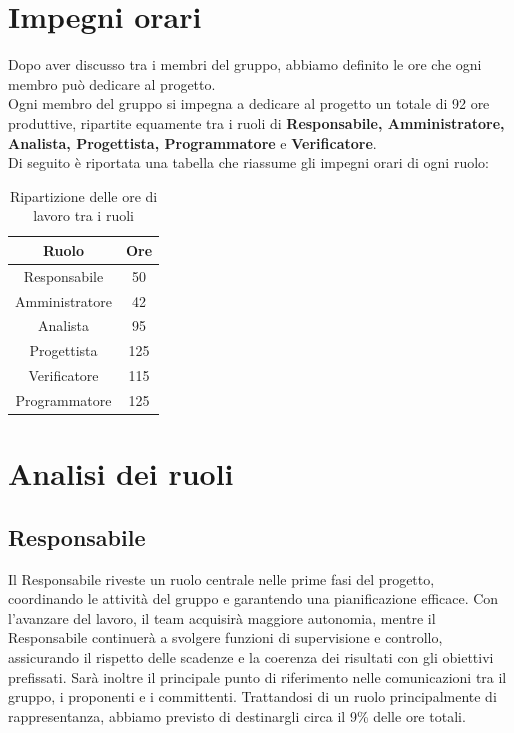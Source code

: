 \documentclass{article}
\begin{document}
	\section{Impegni orari}
	Dopo aver discusso tra i membri del gruppo, abbiamo definito le ore che ogni membro può dedicare al progetto.\\
	Ogni membro del gruppo si impegna a dedicare al progetto un totale di 92 ore produttive, ripartite equamente tra i ruoli di \textbf{Responsabile, Amministratore, Analista, Progettista, Programmatore} e \textbf{Verificatore}.\\
	Di seguito è riportata una tabella che riassume gli impegni orari di ogni ruolo:	
	
	\begin{table}[h!]
		\centering
		\begin{tabular}{|c|c|}
			\hline
			\rowcolor{gray!25}
			Ruolo & Ore \\ \hline
			Responsabile & 50 \\ \hline
			Amministratore & 42 \\ \hline
			Analista & 95 \\ \hline
			Progettista & 125 \\ \hline
			Verificatore & 115 \\ \hline
			Programmatore & 125 \\ \hline
		\end{tabular}
		\caption{Ripartizione delle ore di lavoro tra i ruoli}
	\end{table}
	
	\section{Analisi dei ruoli}
	\subsection{Responsabile}
	Il Responsabile riveste un ruolo centrale nelle prime fasi del progetto, coordinando le attività del gruppo e garantendo una pianificazione efficace.
	Con l’avanzare del lavoro, il team acquisirà maggiore autonomia, mentre il Responsabile continuerà a svolgere funzioni di supervisione e controllo, assicurando il rispetto delle scadenze e la coerenza dei risultati con gli obiettivi prefissati.
	Sarà inoltre il principale punto di riferimento nelle comunicazioni tra il gruppo, i proponenti e i committenti.
	Trattandosi di un ruolo principalmente di rappresentanza, abbiamo previsto di destinargli circa il 9\% delle ore totali.
	
\end{document}
